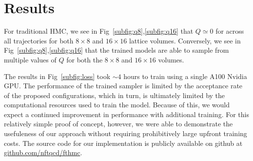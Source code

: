 \documentclass[a4paper,11pt]{article}
\begin{document}
\section{\label{sec:results}Results}
%
For traditional HMC, we see in Fig~\ref{subfig:q8},\ref{subfig:q16}
that \(Q \simeq 0\) for across all trajectories for both \(8\times 8\) and
\(16\times 16\) lattice volumes.
%
Conversely, we see in Fig~\ref{subfig:q8},\ref{subfig:q16} that the trained
models are able to sample from multiple values of \(Q\) for both the \(8\times
8\) and \(16\times16\) volumes.
%

The results in Fig~\ref{subfig:loss} took \(\sim 4\) hours to train using a
single A100 Nvidia GPU.
%
The performance of the trained sampler is limited by the acceptance rate of the
proposed configurations, which in turn, is ultimately limited by the
computational resources used to train the model.
%
Because of this, we would expect a continued improvement in performance with
additional training.
%
For this relatively simple proof of concept, however, we were able to
demonstrate the usefuleness of our approach without requiring prohibitively
large upfront training costs.
%
The source code for our implementation is publicly available on github at
\href{https://www.github.com/nftqcd/fthmc}{github.com/nftqcd/fthmc}.
%
\end{document}
